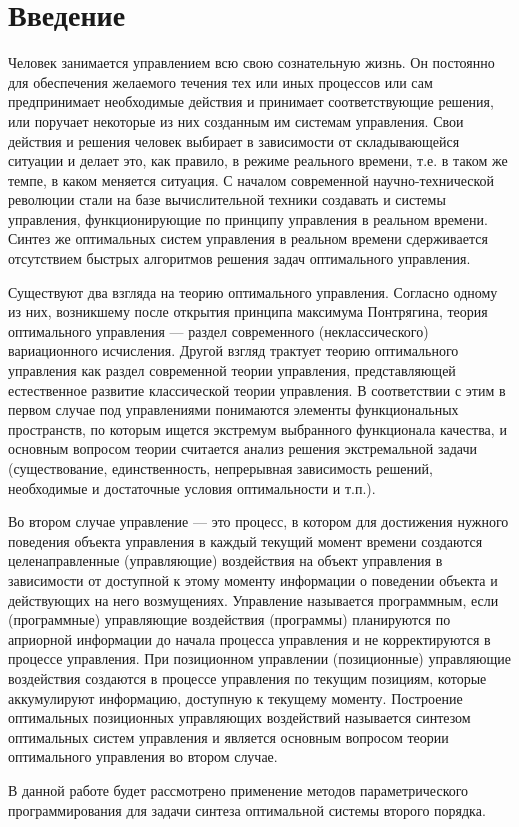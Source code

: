 \chapter*{Введение}


Человек занимается управлением всю свою сознательную жизнь. Он постоянно для обеспечения желаемого течения тех или иных процессов или сам предпринимает необходимые действия и принимает соответствующие решения, или поручает некоторые из них созданным им системам управления. Свои действия и решения человек выбирает в зависимости от складывающейся ситуации и делает это, как правило, в режиме реального времени, т.е. в таком же темпе, в каком меняется ситуация. С началом современной научно-технической революции стали на базе вычислительной техники создавать и системы управления, функционирующие по принципу управления в реальном времени. Синтез же оптимальных систем управления в реальном времени сдерживается отсутствием быстрых алгоритмов решения задач оптимального управления.

Существуют два взгляда на теорию оптимального управления. Согласно одному из них, возникшему после открытия принципа максимума Понтрягина, теория оптимального управления — раздел современного (неклассического) вариационного исчисления. Другой взгляд трактует теорию оптимального управления как раздел современной теории управления, представляющей естественное развитие классической теории управления. В соответствии с этим в первом случае под управлениями понимаются элементы функциональных пространств, по которым ищется экстремум выбранного функционала качества, и основным вопросом теории считается анализ решения экстремальной задачи (существование, единственность, непрерывная зависимость решений, необходимые и достаточные условия оптимальности и т.п.). 

Во втором случае управление — это процесс, в котором для достижения нужного поведения объекта управления в каждый текущий момент времени создаются целенаправленные (управляющие) воздействия на объект управления в зависимости от доступной к этому моменту информации о поведении объекта и действующих на него возмущениях. Управление называется программным, если (программные) управляющие воздействия (программы) планируются по априорной информации до начала процесса управления и не корректируются в процессе управления. При позиционном управлении (позиционные) управляющие воздействия создаются в процессе управления по текущим позициям, которые аккумулируют информацию, доступную к текущему моменту. Построение оптимальных позиционных управляющих воздействий называется синтезом оптимальных систем управления и является основным вопросом теории оптимального управления во втором случае.

В данной работе будет рассмотрено применение методов параметрического программирования для задачи синтеза оптимальной системы второго порядка.
